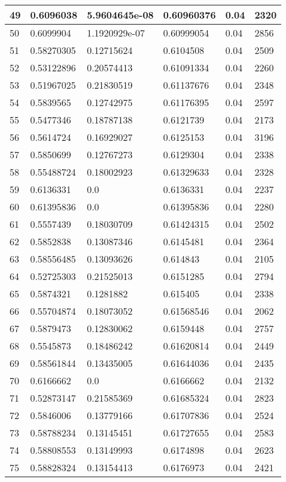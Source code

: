 \begin{longtable}{|l|l|l|l|l|l|}
49 & 0.6096038 & 5.9604645e-08 & 0.60960376 & 0.04 & 2320 \\ \hline 
50 & 0.6099904 & 1.1920929e-07 & 0.60999054 & 0.04 & 2856 \\ \hline 
51 & 0.58270305 & 0.12715624 & 0.6104508 & 0.04 & 2509 \\ \hline 
52 & 0.53122896 & 0.20574413 & 0.61091334 & 0.04 & 2260 \\ \hline 
53 & 0.51967025 & 0.21830519 & 0.61137676 & 0.04 & 2348 \\ \hline 
54 & 0.5839565 & 0.12742975 & 0.61176395 & 0.04 & 2597 \\ \hline 
55 & 0.5477346 & 0.18787138 & 0.6121739 & 0.04 & 2173 \\ \hline 
56 & 0.5614724 & 0.16929027 & 0.6125153 & 0.04 & 3196 \\ \hline 
57 & 0.5850699 & 0.12767273 & 0.6129304 & 0.04 & 2338 \\ \hline 
58 & 0.55488724 & 0.18002923 & 0.61329633 & 0.04 & 2328 \\ \hline 
59 & 0.6136331 & 0.0 & 0.6136331 & 0.04 & 2237 \\ \hline 
60 & 0.61395836 & 0.0 & 0.61395836 & 0.04 & 2280 \\ \hline 
61 & 0.5557439 & 0.18030709 & 0.61424315 & 0.04 & 2502 \\ \hline 
62 & 0.5852838 & 0.13087346 & 0.6145481 & 0.04 & 2364 \\ \hline 
63 & 0.58556485 & 0.13093626 & 0.614843 & 0.04 & 2105 \\ \hline 
64 & 0.52725303 & 0.21525013 & 0.6151285 & 0.04 & 2794 \\ \hline 
65 & 0.5874321 & 0.1281882 & 0.615405 & 0.04 & 2338 \\ \hline 
66 & 0.55704874 & 0.18073052 & 0.61568546 & 0.04 & 2062 \\ \hline 
67 & 0.5879473 & 0.12830062 & 0.6159448 & 0.04 & 2757 \\ \hline 
68 & 0.5545873 & 0.18486242 & 0.61620814 & 0.04 & 2449 \\ \hline 
69 & 0.58561844 & 0.13435005 & 0.61644036 & 0.04 & 2435 \\ \hline 
70 & 0.6166662 & 0.0 & 0.6166662 & 0.04 & 2132 \\ \hline 
71 & 0.52873147 & 0.21585369 & 0.61685324 & 0.04 & 2823 \\ \hline 
72 & 0.5846006 & 0.13779166 & 0.61707836 & 0.04 & 2524 \\ \hline 
73 & 0.58788234 & 0.13145451 & 0.61727655 & 0.04 & 2583 \\ \hline 
74 & 0.58808553 & 0.13149993 & 0.6174898 & 0.04 & 2623 \\ \hline 
75 & 0.58828324 & 0.13154413 & 0.6176973 & 0.04 & 2421 \\ \hline 
\end{longtable}